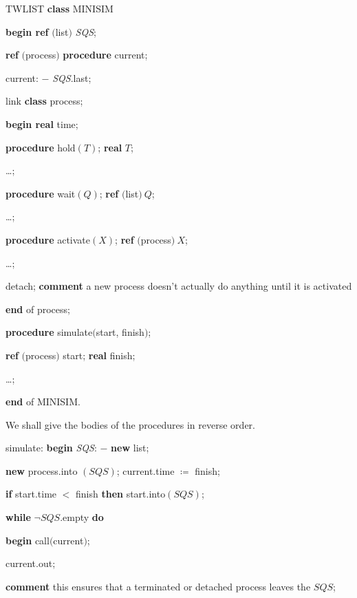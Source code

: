 \quad TWLIST \textbf{class} MINISIM

\quad \textbf{begin ref} $($list$)$ \textit{SQS};

\quad \quad \textbf{ref} $($process$)$ \textbf{procedure} current;

\quad \quad \quad current: $-$ \textit{SQS}.last;

\quad \quad \quad link \textbf{class} process;

\quad \quad \quad \quad \textbf{begin real} time;

\quad \quad \quad \quad \quad \textbf{procedure} hold$(T)$; \textbf{real} $T$;

\quad \quad \quad \quad \quad \quad \dots;

\quad \quad \quad \quad \quad \textbf{procedure} wait$(Q)$; \textbf{ref} $($list$)\ Q$;

\quad \quad \quad \quad \quad \quad \dots;

\quad \quad \quad \quad \quad \textbf{procedure} activate$(X)$; \textbf{ref} $($process$)\ X$;

\quad \quad \quad \quad \quad \quad \dots;

\parindent\quad \quad \quad \quad \quad detach; \textbf{comment} a new process doesn't actually do anything until it is activated

\quad \quad \quad \quad \textbf{end} of process;

\quad \quad \quad \textbf{procedure} simulate$($start, finish$)$;

\quad \quad \quad \quad \textbf{ref} $($process$)$ start; \textbf{real} finish;

\quad \quad \quad \quad \quad \dots;

\quad \quad \textbf{end} of MINISIM.

\noindent
We shall give the bodies of the procedures in reverse order.

\quad simulate: \textbf{begin} \textit{SQS}: $-$ \textbf{new} list;

\quad \quad \textbf{new} process.into $(SQS)$; current.time $\coloneq$ finish;

\quad \quad \quad \textbf{if} start.time $<$ finish \textbf{then} start.into$(SQS)$;

\quad \quad \quad \textbf{while} $\neg SQS$.empty \textbf{do}

\quad \quad \quad \quad \textbf{begin} call$($current$)$;

\quad \quad \quad \quad \quad current.out;

\parindent\quad \quad \quad \quad \quad \textbf{comment} this ensures that a terminated or detached process leaves the $SQS$;

